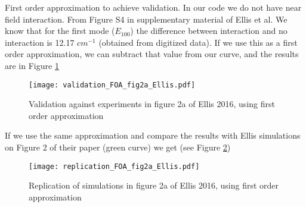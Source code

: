 First order approximation to achieve validation. In our code we do not have near 
field interaction. From Figure S4 in supplementary material of Ellis et al. We know that 
for the first mode ($E_{100}$) the difference between interaction and no interaction is 
12.17 $cm^{-1}$ (obtained from digitized data). If we use this as a first order approximation,
we can subtract that value from our curve, and the results are in Figure \ref{fig:val_2a}

\begin{figure}
    \centering
    \texttt{[image: validation\_FOA\_fig2a\_Ellis.pdf]} 
    \caption{Validation against experiments in figure 2a of Ellis 2016, using first order approximation}
    \label{fig:val_2a}
 \end{figure}

If we use the same approximation and compare the results with Ellis simulations on
Figure 2 of their paper (green curve) we get (see Figure \ref{fig:rep_2a})

\begin{figure}
    \centering
    \texttt{[image: replication\_FOA\_fig2a\_Ellis.pdf]} 
    \caption{Replication of simulations in figure 2a of Ellis 2016, using first
     order approximation}
    \label{fig:rep_2a}
 \end{figure}